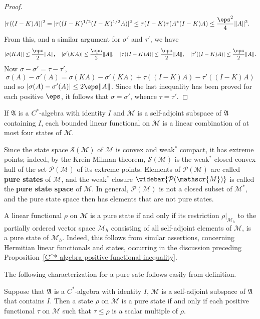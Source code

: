 \begin{proof}
\begin{align*}
|\tau((I-K)A)|^2&=|\tau((I-K)^{1/2}(I-K)^{1/2}A)|^2\leq\tau(I-K)\tau(A^*(I-K)A)\leq\frac{\eps^2}{4}\|A\|^2.
\end{align*}
From this, and a similar argument for $\sigma'$ and $\tau'$, we have
\[|\sigma(KA)|\leq\frac{\eps}{2}\|A\|,\quad |\sigma'(KA)|\leq\frac{\eps}{2}\|A\|,\quad|\tau((I-K)A)|\leq\frac{\eps}{2}\|A\|,\quad|\tau'((I-K)A)|\leq\frac{\eps}{2}\|A\|.\]
Now $\sigma-\sigma'=\tau-\tau'$,
\[\sigma(A)-\sigma'(A)=\sigma(KA)-\sigma'(KA)+\tau((I-K)A)-\tau'((I-K)A)\]
and so $|\sigma(A)-\sigma'(A)|\leq 2\eps\|A\|$. Since the last inequality has been proved for each positive $\eps$, it follows that $\sigma=\sigma'$, whence $\tau=\tau'$.
\end{proof}
\begin{corollary}
If $\mathfrak{A}$ is a $C^*$-algebra with identity $I$ and $\mathscr{M}$ is a self-adjoint subspace of $\mathfrak{A}$ containing $I$, each bounded linear functional on $\mathscr{M}$ is a linear combination of at most four states of $\mathscr{M}$.
\end{corollary}
Since the state space $\mathcal{S}(\mathscr{M})$ of $\mathscr{M}$ is convex and weak$^*$ compact, it has extreme points; indeed, by the Krein-Milman theorem, $\mathcal{S}(\mathscr{M})$ is the weak$^*$ closed convex hull of the set $\mathcal{P}(\mathscr{M})$ of its extreme points. Elements of $\mathcal{P}(\mathscr{M})$ are called \textbf{pure states} of $\mathscr{M}$, and the weak$^*$ closure $\widebar{\mathcal{P}(\mathscr{M})}$ is called the \textbf{pure state space} of $\mathscr{M}$. In general, $\mathcal{P}(\mathscr{M})$ is not a closed subset of $\mathscr{M}^*$, and the pure state space then has elements that are not pure states.\par
A linear functional $\rho$ on $\mathscr{M}$ is a pure state if and only if its restriction $\rho|_{\mathscr{M}_h}$ to the partially ordered vector space $\mathscr{M}_h$ consisting of all self-adjoint elements of $\mathscr{M}$, is a pure state of $\mathscr{M}_h$. Indeed, this follows from similar assertions, concerning Hermitian linear functionals and states, occurring in the discussion preceding Proposition~\ref{C^* algebra positive functional inequality}.\par
The following characterization for a pure sate follows easily from definition.
\begin{proposition}\label{C^* algebra pure state iff}
Suppose that $\mathfrak{A}$ is a $C^*$-algebra with identity $I$, $\mathscr{M}$ is a self-adjoint subspace of $\mathfrak{A}$ that contains $I$. Then a state $\rho$ on $\mathscr{M}$ is a pure state if and only if each positive functional $\tau$ on $\mathscr{M}$ such that $\tau\leq\rho$ is a scalar multiple of $\rho$.
\end{proposition}
